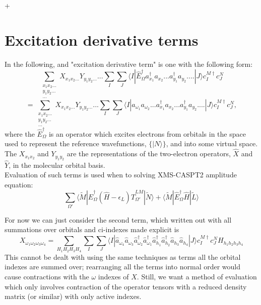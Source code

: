 +\documentclass[12pt]{article}
\begin{document}
\section{Excitation derivative terms}
In the following, and "excitation derivative term" is one with the following form:
\begin{equation*}
\sum_{\substack{ x_{1}x_{2}...\\ y_{1}y_{2}... \\ ...}} X_{x_{1}x_{2}...} Y_{y_{1}y_{2}...} ...
\sum_{I}\sum_{J}
\langle I | \hat{E}^{\dagger}_{\Omega} a^{\dagger}_{x_{1}} a_{x_{2}}...a^{\dagger}_{y_{1}}a_{y_{2}}....| J \rangle 
 c^{M \dagger}_{I}c^{N}_{J}
\end{equation*}
\begin{equation}
=
\sum_{\substack{ x_{1}x_{2}...\\ y_{1}y_{2}... \\ ...}} X_{x_{1}x_{2}...} Y_{y_{1}y_{2}...} ...
\sum_{I}\sum_{J}
\langle I | a_{\omega_{1}} a_{\omega_{2}}.. .a^{\dagger}_{x_{1}} a_{x_{2}}...a^{\dagger}_{y_{1}}a_{y_{2}}....| J \rangle 
 c^{M \dagger}_{I}c^{N}_{J},
\label{eqn:basic_2nd_quantized_projector}
\end{equation}
\noindent where the $\hat{E}^{\dagger}_{\Omega}$ is an operator which excites
electrons from orbitals in the space used to represent the reference
wavefunctions, $\{|N\rangle\}$, and into some virtual space. The
$X_{x_{1}x_{2}}$ and  $Y_{y_{1}y_{2}}$ are the representations of the
two-electron operators, $\hat{X}$ and $\hat{Y}$, in the molecular orbital
basis.\\

\noindent Evaluation of such terms is used when to solving XMS-CASPT2 amplitude equation: 
\begin{equation*}
\sum_{\Omega'}
\langle \tilde{M} | \hat{E}^{\dagger}_{\Omega} (\hat{H} - \epsilon_{L}) \hat{T}^{LM}_{\Omega'}| \tilde{N} \rangle 
+
\langle \tilde{M} | \hat{E}^{\dagger}_{\Omega}\hat{H}| \tilde{L} \rangle 
\end{equation*}

\noindent For now we can just consider the second term, which written out with all
summations over orbitals and ci-indexes made explicit is
\begin{equation}
X_{\omega_{1}\omega_{2}\omega_{3}\omega_{4}}
= 
\sum_{ H_{1}H_{2}H_{3}H_{4}} 
\sum_{I}\sum_{J}
\langle I |
\hat{a}_{\omega_{4}} \hat{a}_{\omega_{3}}\hat{a}^{\dagger}_{\omega_{2}}\hat{a}^{\dagger}_{\omega_{1}}
\hat{a}^{\dagger}_{h_{1}} \hat{a}^{\dagger}_{h_{2}}\hat{a}_{h_{3}}\hat{a}_{h_{4}}| J \rangle  
c^{M \dagger}_{I}c^{N}_{J} H_{h_{1}h_{2}h_{3}h_{4}}
\label{eqn:XH_example}
\end{equation}
This cannot be dealt with using the same techniques as terms all the orbital
indexes are summed over; rearranging all the terms into normal order would
cause contractions with the $\omega$ indexes of $X$. Still, we want a method of
evaluation which only involves contraction of the operator tensors with a
reduced density matrix (or similar) with only active indexes.
\end{document}

